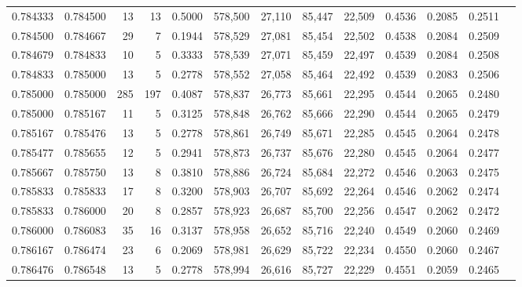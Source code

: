 \begin{tabular}{rrrrrrrrrrrrr}
0.784333 & 0.784500 &    13 &  13 &                                     0.5000 & 578,500 &  27,110 &  85,447 &  22,509 & 0.4536 & 0.2085 & 0.2511 \\
0.784500 & 0.784667 &    29 &   7 &                                     0.1944 & 578,529 &  27,081 &  85,454 &  22,502 & 0.4538 & 0.2084 & 0.2509 \\
0.784679 & 0.784833 &    10 &   5 &                                     0.3333 & 578,539 &  27,071 &  85,459 &  22,497 & 0.4539 & 0.2084 & 0.2508 \\
0.784833 & 0.785000 &    13 &   5 &                                     0.2778 & 578,552 &  27,058 &  85,464 &  22,492 & 0.4539 & 0.2083 & 0.2506 \\
0.785000 & 0.785000 &   285 & 197 &                                     0.4087 & 578,837 &  26,773 &  85,661 &  22,295 & 0.4544 & 0.2065 & 0.2480 \\
0.785000 & 0.785167 &    11 &   5 &                                     0.3125 & 578,848 &  26,762 &  85,666 &  22,290 & 0.4544 & 0.2065 & 0.2479 \\
0.785167 & 0.785476 &    13 &   5 &                                     0.2778 & 578,861 &  26,749 &  85,671 &  22,285 & 0.4545 & 0.2064 & 0.2478 \\
0.785477 & 0.785655 &    12 &   5 &                                     0.2941 & 578,873 &  26,737 &  85,676 &  22,280 & 0.4545 & 0.2064 & 0.2477 \\
0.785667 & 0.785750 &    13 &   8 &                                     0.3810 & 578,886 &  26,724 &  85,684 &  22,272 & 0.4546 & 0.2063 & 0.2475 \\
0.785833 & 0.785833 &    17 &   8 &                                     0.3200 & 578,903 &  26,707 &  85,692 &  22,264 & 0.4546 & 0.2062 & 0.2474 \\
0.785833 & 0.786000 &    20 &   8 &                                     0.2857 & 578,923 &  26,687 &  85,700 &  22,256 & 0.4547 & 0.2062 & 0.2472 \\
0.786000 & 0.786083 &    35 &  16 &                                     0.3137 & 578,958 &  26,652 &  85,716 &  22,240 & 0.4549 & 0.2060 & 0.2469 \\
0.786167 & 0.786474 &    23 &   6 &                                     0.2069 & 578,981 &  26,629 &  85,722 &  22,234 & 0.4550 & 0.2060 & 0.2467 \\
0.786476 & 0.786548 &    13 &   5 &                                     0.2778 & 578,994 &  26,616 &  85,727 &  22,229 & 0.4551 & 0.2059 & 0.2465 \\

\end{tabular}
